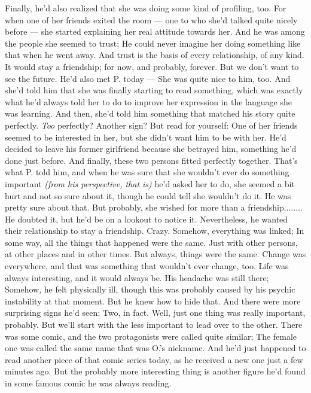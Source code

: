 Finally, he'd also realized that she was doing some kind of profiling, too. 
For when one of her friends exited the room --- one to who she'd talked quite nicely before --- she started explaining her real attitude towards her. 
And he was among the people she seemed to trust; He could never imagine her doing something like that when he went away. 
And trust is the basis of every relationship, of any kind. 
It would stay a friendship; for now, and probably, forever. 
But we don't want to see the future. 
He'd also met P. today --- She was quite nice to him, too. 
And she'd told him that she was finally starting to read something, which was exactly what he'd always told her to do to improve her expression in the language she was learning. 
And then, she'd told him something that matched his story quite perfectly. 
\emph{Too} perfectly?
Another sign?
But read for yourself:
One of her friends seemed to be interested in her, but she didn't want him to be with her. 
He'd decided to leave his former girlfriend because she betrayed him, something he'd done just before. 
And finally, these two persons fitted perfectly together. 
That's what P. told him, and when he was sure that she wouldn't ever do something important \emph{(from his perspective, that is)} he'd asked her to do, she seemed a bit hurt and not so sure about it, though he could tell she wouldn't do it. 
He was pretty sure about that. 
But probably, she wished for more than a friendship........
He doubted it, but he'd be on a lookout to notice it. 
Nevertheless, he wanted their relationship to stay a friendship. 
Crazy. 
Somehow, everything was linked; In some way, all the things that happened were the same. 
Just with other persons, at other places and in other times. 
But always, things were the same. 
Change was everywhere, and that was something that wouldn't ever change, too. 
Life was always interesting, and it would always be. 
His headache was still there; Somehow, he felt physically ill, though this was probably caused by his psychic instability at that moment. 
But he knew how to hide that. 
And there were more surprising signs he'd seen: Two, in fact. 
Well, just one thing was really important, probably. 
But we'll start with the less important to lead over to the other. 
There was some comic, and the two protagonists were called quite similar; The female one was called the same name that was O.'s nickname. 
And he'd just happened to read another piece of that comic series today, as he received a new one just a few minutes ago. 
But the probably more interesting thing is another figure he'd found in some famous comic he was always reading. 
